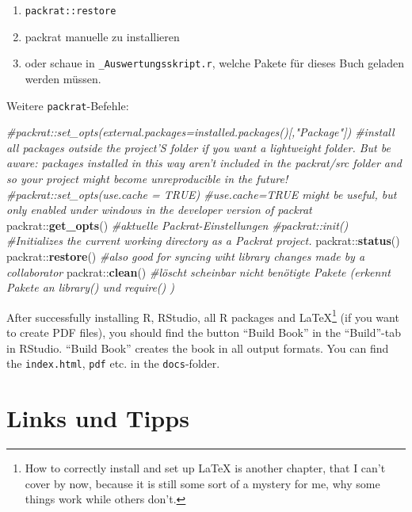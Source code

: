 \documentclass[]{book}
\makeatletter
\newenvironment{Shaded}{\begin{snugshade}}{\end{snugshade}}
\newcommand{\KeywordTok}[1]{\textcolor[rgb]{0.13,0.29,0.53}{\textbf{{#1}}}}
\newcommand{\CommentTok}[1]{\textcolor[rgb]{0.56,0.35,0.01}{\textit{{#1}}}}
\newcommand{\NormalTok}[1]{{#1}}
\providecommand{\tightlist}{%
  \setlength{\itemsep}{0pt}\setlength{\parskip}{0pt}}
\let\rmarkdownfootnote\footnote%
\def\footnote{\protect\rmarkdownfootnote}
\newenvironment{kframe}{%
\medskip{}
\setlength{\fboxsep}{.8em}
 \def\at@end@of@kframe{}%
 \ifinner\ifhmode%
  \def\at@end@of@kframe{\end{minipage}}%
  \begin{minipage}{\columnwidth}%
 \fi\fi%
 \def\FrameCommand##1{\hskip\@totalleftmargin \hskip-\fboxsep
 \colorbox{shadecolor}{##1}\hskip-\fboxsep
     \hskip-\linewidth \hskip-\@totalleftmargin \hskip\columnwidth}%
 \MakeFramed {\advance\hsize-\width
   \@totalleftmargin\z@ \linewidth\hsize
   \@setminipage}}%
 {\par\unskip\endMakeFramed%
 \at@end@of@kframe}
\renewenvironment{Shaded}{\begin{kframe}}{\end{kframe}}
\theoremstyle{definition}
\theoremstyle{definition}
\theoremstyle{remark}
\makeatother
\begin{document}
\begin{enumerate}
\def\labelenumi{\alph{enumi})}
\tightlist
\item
  \texttt{packrat::restore}
\item
  packrat manuelle zu installieren
\item
  oder schaue in \texttt{\_Auswertungsskript.r}, welche Pakete für
  dieses Buch geladen werden müssen.
\end{enumerate}

Weitere \texttt{packrat}-Befehle:

\begin{Shaded}
\begin{Highlighting}[]
\CommentTok{#packrat::set_opts(external.packages=installed.packages()[,"Package"])  #install all packages outside the project'S folder if you want a lightweight folder. But be aware: packages installed in this way aren't included in the packrat/src folder and so your project might become unreproducible in the future!}
\CommentTok{#packrat::set_opts(use.cache = TRUE)  #use.cache=TRUE might be useful, but only enabled under windows in the developer version of packrat}
\NormalTok{packrat::}\KeywordTok{get_opts}\NormalTok{()  }\CommentTok{#aktuelle Packrat-Einstellungen}
\CommentTok{#packrat::init()  #Initializes the current working directory as a Packrat project.}
\NormalTok{packrat::}\KeywordTok{status}\NormalTok{()}
\NormalTok{packrat::}\KeywordTok{restore}\NormalTok{()  }\CommentTok{#also good for syncing wiht library changes made by a collaborator}
\NormalTok{packrat::}\KeywordTok{clean}\NormalTok{()  }\CommentTok{#löscht scheinbar nicht benötigte Pakete (erkennt Pakete an library() und require() )}
\end{Highlighting}
\end{Shaded}

After successfully installing R, RStudio, all R packages and
LaTeX\footnote{How to correctly install and set up LaTeX is another
  chapter, that I can't cover by now, because it is still some sort of a
  mystery for me, why some things work while others don't.} (if you want
to create PDF files), you should find the button ``Build Book'' in the
``Build''-tab in RStudio. ``Build Book'' creates the book in all output
formats. You can find the \texttt{index.html}, \texttt{pdf} etc. in the
\texttt{docs}-folder.

\hypertarget{links-und-tipps}{\section*{Links und
Tipps}\label{links-und-tipps}}
\end{document}
